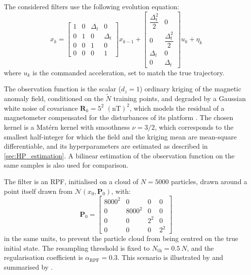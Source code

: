 The considered filters use the following evolution equation:
\begin{equation}
	x_k=\begin{bmatrix}
	1&0&\Delta_t&0\\
	0&1&0&\Delta_t\\
	0&0&1&0\\
	0&0&0&1
	\end{bmatrix}x_{k-1}+\begin{bmatrix}
	\dfrac{\Delta_t^2}{2}&0\\
	0&\dfrac{\Delta_t^2}{2}\\
	\Delta_t&0\\
	0&\Delta_t
	\end{bmatrix}u_k+\eta_k
\end{equation}
where $u_k$ is the commanded acceleration, set to match the true trajectory.

The observation function is the scalar ($d_z=1$) ordinary kriging of the magnetic anomaly field, conditioned on the $\tilde{N}$ training points, and degraded by a Gaussian white noise of covariance $\mathbf{R}_k=5^2$ $(\text{nT})^2$, which models the residual of a magnetometer compensated for the disturbances of its platform \cite{bib:magnetic-compensation,bib:these-Gnadt}. The chosen kernel is a Matérn kernel with smoothness $\nu=3/2$, which corresponds to the smallest half-integer for which the field and the kriging mean are mean-square differentiable, and its hyperparameters are estimated as described in \cref{sec:HP_estimation}. A bilinear estimation of the observation function on the same samples is also used for comparison.

The filter is an RPF, initialised on a cloud of $N=5000$ particles, drawn around a point itself drawn from $\mathcal{N}(x_0,\mathbf{P}_0)$, with:
\begin{equation}
	\mathbf{P}_0=\begin{bmatrix}
	8000^2&0&0&0\\
	0&8000^2&0&0\\
	0&0&2^2&0\\
	0&0&0&2^2
	\end{bmatrix}
\end{equation}
in the same units, to prevent the particle cloud from being centred on the true initial state. The resampling threshold is fixed to $N_\mathrm{th}=0.5\:N$, and the regularisation coefficient is $\alpha_{\mathrm{RPF}}=0.3$. This scenario is illustrated by  and summarised by .

